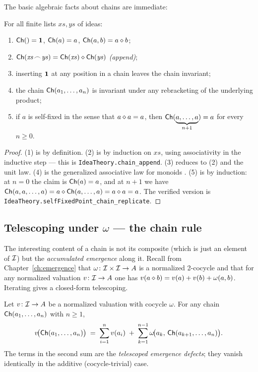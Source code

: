 The basic algebraic facts about chains are immediate:

\begin{lemma}\label{lem:chain-calc}
For all finite lists $\mathit{xs}, \mathit{ys}$ of ideas:
\begin{enumerate}
  \item $\mathsf{Ch}() = \mathbf{1}$, $\mathsf{Ch}(a) = a$, $\mathsf{Ch}(a,b) = a\mathbin{\diamond} b$;
  \item $\mathsf{Ch}(\mathit{xs}\!\frown\!\mathit{ys})
        = \mathsf{Ch}(\mathit{xs})\mathbin{\diamond}\mathsf{Ch}(\mathit{ys})$
        \emph{(append)};
  \item inserting $\mathbf{1}$ at any position in a chain leaves the chain
        invariant;
  \item the chain $\mathsf{Ch}(a_1,\dots,a_n)$ is invariant under any
        rebracketing of the underlying product;
  \item if $a$ is self-fixed in the sense that $a\mathbin{\diamond} a = a$, then
        $\mathsf{Ch}(\underbrace{a,\dots,a}_{n+1}) = a$ for every $n\ge 0$.
\end{enumerate}
\end{lemma}

\begin{proof}
(1) is by definition. (2) is by induction on $\mathit{xs}$, using
associativity in the inductive step --- this is
\texttt{IdeaTheory.chain\_append}. (3) reduces to (2) and the unit law.
(4) is the generalized associative law for monoids
\cite[ch.~II]{Bourbaki1989}. (5) is by induction: at $n=0$ the claim is
$\mathsf{Ch}(a) = a$, and at $n+1$ we have $\mathsf{Ch}(a,a,\dots,a) = a\mathbin{\diamond}
\mathsf{Ch}(a,\dots,a) = a\mathbin{\diamond} a = a$. The verified version is
\texttt{IdeaTheory.selfFixedPoint\_chain\_replicate}.
\end{proof}

\subsection*{Telescoping under $\omega$ --- the chain rule}

The interesting content of a chain is not its composite (which is just
an element of $\mathcal{I}$) but the \emph{accumulated emergence} along it.
Recall from Chapter~\ref{ch:emergence} that $\omega\colon\mathcal{I}\times
\mathcal{I}\to A$ is a normalized 2-cocycle and that for any normalized
valuation $v\colon\mathcal{I}\to A$ one has $v(a\mathbin{\diamond} b) = v(a)+v(b)+
\omega(a,b)$. Iterating gives a closed-form telescoping.

\begin{theorem}\label{thm:chain-rule}
Let $v\colon\mathcal{I}\to A$ be a normalized valuation with cocycle
$\omega$. For any chain $\mathsf{Ch}(a_1,\dots,a_n)$ with $n\ge 1$,
\[
  v\!\bigl(\mathsf{Ch}(a_1,\dots,a_n)\bigr)
  \;=\;
  \sum_{i=1}^{n} v(a_i)
  \;+\;
  \sum_{k=1}^{n-1}
    \omega\!\bigl(a_k,\, \mathsf{Ch}(a_{k+1},\dots,a_n)\bigr).
\]
The terms in the second sum are the \emph{telescoped emergence
defects}; they vanish identically in the additive (cocycle-trivial)
case.
\end{theorem}

